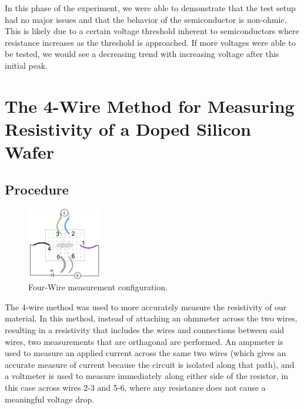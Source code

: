 \documentclass[aps,prl,reprint]{revtex4-2}
\begin{document}
In this phase of the experiment, we were able to demonstrate that the test setup had no 
major issues and that the behavior of the semiconductor is non-ohmic. This is likely due
to a certain voltage threshold inherent to semiconductors where resistance increases as 
the threshold is approached. If more voltages were able to be tested, we would see a decreasing
trend with increasing voltage after this initial peak.\\

\newpage

\section{The 4-Wire Method for Measuring Resistivity of a Doped Silicon Wafer}

\subsection{Procedure}

\begin{figure}
	\begin{center}
		\includegraphics[width=0.29\textwidth]{../Images/l2_4Wire.jpg}
	\end{center}
	\caption{\label{4wire} Four-Wire measurement configuration.}
\end{figure}

The 4-wire method was used to more accurately measure the resistivity of our material. In this
method, instead of attaching an ohmmeter across the two wires, resulting in a resistivity
that includes the wires and connections between said wires, two measurements that are 
orthagonal are performed. An ampmeter is used to measure an applied current across the same
two wires (which gives an accurate measure of current because the circuit is isolated along 
that path), and a voltmeter is used to measure immediately along either side of the resistor,
in this case across wires 2-3 and 5-6, where any resistance does not cause a meaningful 
voltage drop.\\
\end{document}
